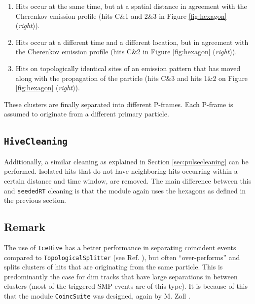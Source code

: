 \vspace{2mm}
\begin{enumerate}
\item Hits occur at the same time, but at a spatial distance in agreement with the Cherenkov emission profile (hits C\&1 and 2\&3 in Figure \ref{fig:hexagon} (\textit{right})).
\item Hits occur at a different time and a different location, but in agreement with the Cherenkov emission profile (hits C\&2 in Figure \ref{fig:hexagon} (\textit{right})).
\item Hits on topologically identical sites of an emission pattern that has moved along with the propagation of the particle (hits C\&3 and hits 1\&2 on Figure \ref{fig:hexagon} (\textit{right})).
\end{enumerate}
\vspace{2mm}

\noindent These clusters are finally separated into different P-frames. Each P-frame is assumed to originate from a different primary particle.

\subsection{\texttt{HiveCleaning}}
Additionally, a similar cleaning as explained in Section \ref{sec:pulsecleaning} can be performed. Isolated hits that do not have neighboring hits occurring within a certain distance and time window, are removed. The main difference between this and \texttt{seededRT} cleaning is that the module again uses the hexagons as defined in the previous section.\\

\subsection{Remark}
\noindent The use of \texttt{IceHive} has a better performance in separating coincident events compared to \texttt{TopologicalSplitter} (see Ref. \cite{mzollthesis}), but often ``over-performs'' and splits clusters of hits that are originating from the same particle. This is predominantly the case for dim tracks that have large separations in between clusters (most of the triggered SMP events are of this type). It is because of this that the module \texttt{CoincSuite}  was designed, again by M. Zoll \cite{mzollthesis}.


